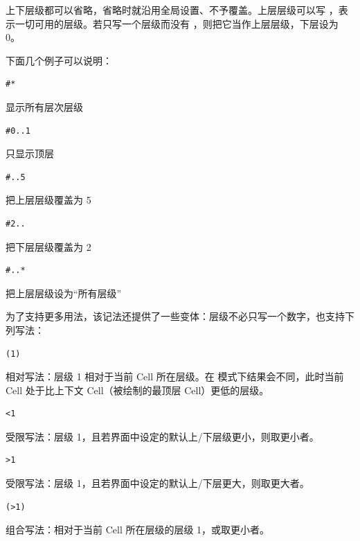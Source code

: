 上下层级都可以省略，省略时就沿用全局设置、不予覆盖。上层层级可以写 \ui{*}，表示一切可用的层级。若只写一个层级而没有 ，则把它当作上层层级，下层设为 0。

下面几个例子可以说明：

\begin{lstlisting}
#*
\end{lstlisting}

显示所有层次层级

\begin{lstlisting}
#0..1
\end{lstlisting}

只显示顶层

\begin{lstlisting}
#..5
\end{lstlisting}

把上层层级覆盖为 5

\begin{lstlisting}
#2..
\end{lstlisting}

把下层层级覆盖为 2

\begin{lstlisting}
#..*
\end{lstlisting}

把上层层级设为“所有层级”

为了支持更多用法，该记法还提供了一些变体：层级不必只写一个数字，也支持下列写法：

\begin{lstlisting}
(1)
\end{lstlisting}

相对写法：层级 1 相对于当前 Cell 所在层级。在  模式下结果会不同，此时当前 Cell 处于比上下文 Cell（被绘制的最顶层 Cell）更低的层级。

\begin{lstlisting}
<1
\end{lstlisting}

受限写法：层级 1，且若界面中设定的默认上/下层级更小，则取更小者。

\begin{lstlisting}
>1
\end{lstlisting}

受限写法：层级 1，且若界面中设定的默认上/下层更大，则取更大者。

\begin{lstlisting}
(>1)
\end{lstlisting}

组合写法：相对于当前 Cell 所在层级的层级 1，或取更小者。

